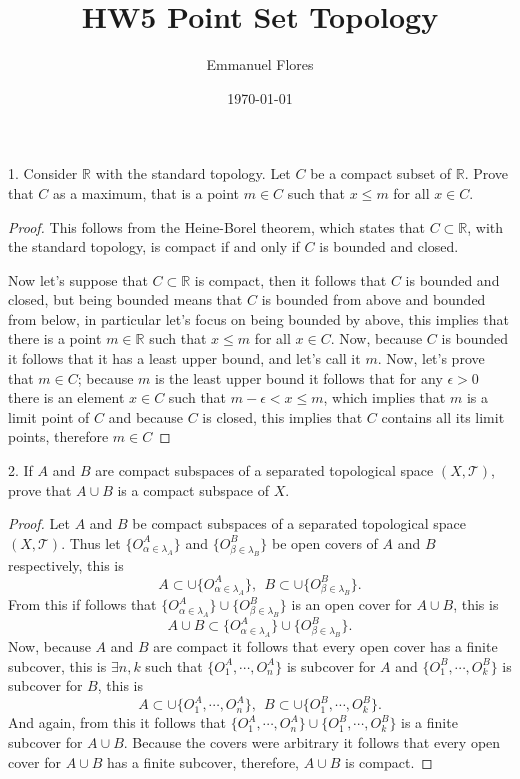 \documentclass[11pt]{amsart}
\title{HW5 Point Set Topology}
\author{Emmanuel Flores}
\date{\today}
\begin{document}
\maketitle

\begin{tcolorbox}
1. Consider $\mathbb{R}$ with the standard topology. Let $C$ be a compact subset of $\mathbb{R}$. Prove that $C$ as a maximum, that is a point $m\in C$ such that $x\leq m$ for all $x\in C$.
\end{tcolorbox}
\begin{proof}
This follows from the Heine-Borel theorem, which states that $C\subset\mathbb{R}$, with the standard topology, is compact if and only if $C$ is bounded and closed. 

Now let's suppose that $C\subset\mathbb{R}$ is compact, then it follows that $C$ is bounded and closed, but being bounded means that $C$ is bounded from above and bounded from below, in particular let's focus on being bounded by above, this implies that there is a point $m\in \mathbb{R}$ such that $x\leq m$ for all $x\in C$. Now, because $C$ is bounded it follows that it has a least upper bound, and let's call it $m$. Now, let's prove that $m\in C$; because $m$ is the least upper bound it follows that for any $\epsilon>0$ there is an element $x\in C$ such that $m-\epsilon<x\leq m$, which implies that $m$ is a limit point of $C$ and because $C$ is closed, this implies that $C$ contains all its limit points, therefore $m\in C$

\end{proof}

\newpage
\begin{tcolorbox}
2. If $A$ and $B$ are compact subspaces of a separated topological space $(X, \mathcal{T})$, prove that $A \cup B$ is a compact subspace of $X$.
\end{tcolorbox}
\begin{proof}
Let $A$ and $B$ be compact subspaces of a separated topological space $(X, \mathcal{T})$. Thus let $\{ O_{\alpha\in\lambda_{A}}^{A} \}$ and $\{ O_{\beta\in\lambda_{B}}^{B} \}$ be open covers of $A$ and $B$ respectively, this is
$$
A\subset \cup \{ O_{\alpha\in\lambda_{A}}^{A} \}, \ \
B\subset \cup \{ O_{\beta\in\lambda_{B}}^{B} \}.
$$
From this if follows that $\{ O_{\alpha\in\lambda_{A}}^{A} \}\cup \{ O_{\beta\in\lambda_{B}}^{B} \}$ is an open cover for $A\cup B$, this is 
$$
A\cup B\subset \{ O_{\alpha\in\lambda_{A}}^{A} \}\cup \{ O_{\beta\in\lambda_{B}}^{B} \}.
$$
Now, because $A$ and $B$ are compact it follows that every open cover has a finite subcover, this is $\exists n,k$ such that $\{ O_{1}^{A},\cdots, O_{n}^{A}\}$ is subcover for $A$ and $\{ O_{1}^{B},\cdots, O_{k}^{B}\}$ is subcover for $B$, this is 
$$
A\subset \cup \{ O_{1}^{A},\cdots, O_{n}^{A}\}, \ \
B\subset \cup \{ O_{1}^{B},\cdots, O_{k}^{B}\}.
$$
And again, from this it follows that $\{ O_{1}^{A},\cdots, O_{n}^{A}\}\cup \{ O_{1}^{B},\cdots, O_{k}^{B}\}$ is a finite subcover for $A\cup B$. Because the covers were arbitrary it follows that every open cover for $A\cup B$ has a finite subcover, therefore, $A\cup B$ is compact.

\end{proof}
\end{document}
